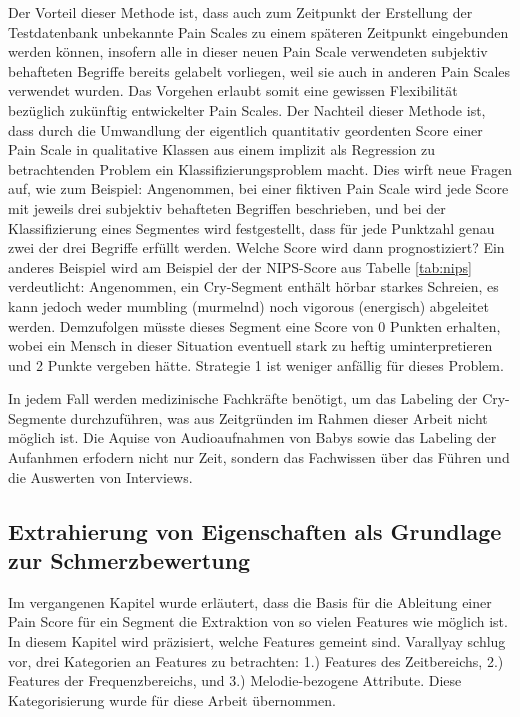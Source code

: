 Der Vorteil dieser Methode ist, dass auch zum Zeitpunkt der Erstellung der Testdatenbank unbekannte Pain Scales zu einem späteren Zeitpunkt eingebunden werden können, insofern alle in dieser neuen Pain Scale verwendeten subjektiv behafteten Begriffe bereits gelabelt vorliegen, weil sie auch in anderen Pain Scales verwendet wurden. Das Vorgehen erlaubt somit eine gewissen Flexibilität bezüglich zukünftig entwickelter Pain Scales. Der Nachteil dieser Methode ist, dass durch die Umwandlung der eigentlich quantitativ geordenten Score einer Pain Scale in qualitative Klassen aus einem implizit als Regression zu betrachtenden Problem ein Klassifizierungsproblem macht. Dies wirft neue Fragen auf, wie zum Beispiel: Angenommen, bei einer fiktiven Pain Scale wird jede Score mit jeweils drei subjektiv behafteten Begriffen beschrieben, und bei der Klassifizierung eines Segmentes wird festgestellt, dass für jede Punktzahl genau zwei der drei Begriffe erfüllt werden. Welche Score wird dann prognostiziert? Ein anderes Beispiel wird am Beispiel der der NIPS-Score aus Tabelle \ref{tab:nips} verdeutlicht: Angenommen, ein Cry-Segment enthält hörbar \glqq starkes\grqq{} Schreien, es kann jedoch weder \glqq mumbling (murmelnd) \grqq{} noch \glqq vigorous (energisch)\grqq{} abgeleitet werden. Demzufolgen müsste dieses Segment eine Score von 0 Punkten erhalten, wobei ein Mensch in dieser Situation eventuell \glqq stark\grqq{} zu \glqq heftig\grqq{} uminterpretieren und 2 Punkte vergeben hätte. Strategie 1 ist weniger anfällig für dieses Problem.

In jedem Fall werden medizinische Fachkräfte benötigt, um das Labeling der Cry-Segmente durchzuführen, was aus Zeitgründen im Rahmen dieser Arbeit nicht möglich ist. Die Aquise von Audioaufnahmen von Babys sowie das Labeling der Aufanhmen erfodern nicht nur Zeit, sondern das Fachwissen über das Führen und die Auswerten von Interviews.

\subsection{Extrahierung von Eigenschaften als Grundlage zur Schmerzbewertung}
\label{sec:segmentFeatures}

Im vergangenen Kapitel wurde erläutert, dass die Basis für die Ableitung einer Pain Score für ein Segment die Extraktion von \glqq so vielen Features wie möglich\grqq{} ist. In diesem Kapitel wird präzisiert, welche Features gemeint sind.  Varallyay \cite[S. 16 - 17]{cry_thesis} schlug vor, drei Kategorien an Features zu betrachten: 1.) Features des Zeitbereichs, 2.) Features der Frequenzbereichs, und 3.) Melodie-bezogene Attribute. Diese Kategorisierung wurde für diese Arbeit übernommen.

